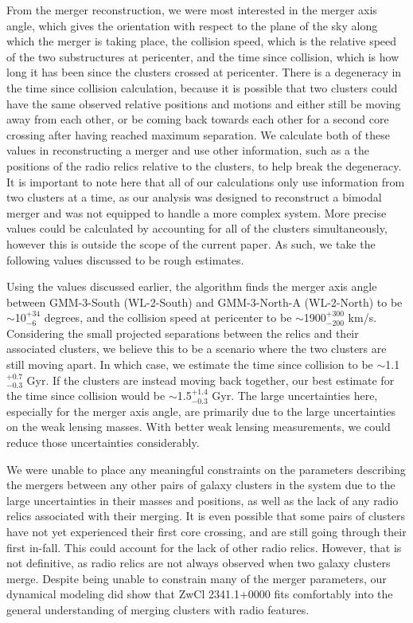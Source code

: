 \documentclass[onecolumn]{aastex}
\begin{document}
From the merger reconstruction, we were most interested in the merger axis angle, which gives the orientation with respect to the plane of the sky along which the merger is taking place, the collision speed, which is the relative speed of the two substructures at pericenter, and the time since collision, which is how long it has been since the clusters crossed at pericenter.  There is a degeneracy in the time since collision calculation, because it is possible that two clusters could have the same observed relative positions and motions and either still be moving away from each other, or be coming back towards each other for a second core crossing after having reached maximum separation.  We calculate both of these values in reconstructing a merger and use other information, such as a the positions of the radio relics relative to the clusters, to help break the degeneracy.  It is important to note here that all of our calculations only use information from two clusters at a time, as our analysis was designed to reconstruct a bimodal merger and was not equipped to handle a more complex system.  More precise values could be calculated by accounting for all of the clusters simultaneously, however this is outside the scope of the current paper.  As such, we take the following values discussed to be rough estimates.

Using the values discussed earlier, the \cite{Dawson13} algorithm finds the merger axis angle between GMM-3-South (WL-2-South) and GMM-3-North-A (WL-2-North) to be $\sim$10$^{+34}_{-6}$ degrees, and the collision speed at pericenter to be $\sim$1900$^{+300}_{-200}$ km/s.  Considering the small projected separations between the relics and their associated clusters, we believe this to be a scenario where the two clusters are still moving apart.  In which case, we estimate the time since collision to be $\sim$1.1$^{+0.7}_{-0.3}$ Gyr.  If the clusters are instead moving back together, our best estimate for the time since collision would be $\sim$1.5$^{+1.4}_{-0.3}$ Gyr. The large uncertainties here, especially for the merger axis angle, are primarily due to the large uncertainties on the weak lensing masses.  With better weak lensing measurements, we could reduce those uncertainties considerably.

We were unable to place any meaningful constraints on the parameters describing the mergers between any other pairs of galaxy clusters in the system due to the large uncertainties in their masses and positions, as well as the lack of any radio relics associated with their merging.  It is even possible that some pairs of clusters have not yet experienced their first core crossing, and are still going through their first in-fall.  This could account for the lack of other radio relics.  However, that is not definitive, as radio relics are not always observed when two galaxy clusters merge.  Despite being unable to constrain many of the merger parameters, our dynamical modeling did show that ZwCl 2341.1+0000 fits comfortably into the general understanding of merging clusters with radio features.
\end{document}
